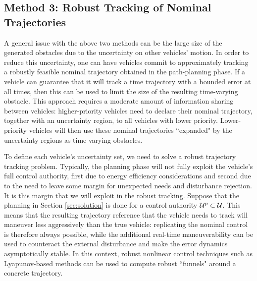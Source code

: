 \subsection{Method 3: Robust Tracking of Nominal Trajectories}
A general issue with the above two methods can be the large size of the generated obstacles due to the uncertainty on other vehicles' motion. In order to reduce this uncertainty, one can have vehicles commit to approximately tracking a robustly feasible nominal trajectory obtained in the path-planning phase. If a vehicle can guarantee that it will track a time trajectory with a bounded error at all times, then this can be used to limit the size of the resulting time-varying obstacle. This approach requires a moderate amount of information sharing between vehicles: higher-priority vehicles need to declare their nominal trajectory, together with an uncertainty region, to all vehicles with lower priority. Lower-priority vehicles will then use these nominal trajectories ``expanded" by the uncertainty regions as time-varying obstacles.

To define each vehicle's uncertainty set, we need to solve a robust trajectory tracking problem.
Typically, the planning phase will not fully exploit the vehicle's full control authority, first due to energy efficiency considerations and second due to the need to leave some margin for unexpected needs and disturbance rejection. It is this margin that we will exploit in the robust tracking. Suppose that the planning in Section \ref{sec:solution} is done for a control authority $\mathcal{U}^p\subset\mathcal{U}$. This means that the resulting trajectory reference that the vehicle needs to track will maneuver less aggressively than the true vehicle: replicating the nominal control is therefore always possible, while the additional real-time maneuverability can be used to counteract the external disturbance and make the error dynamics asymptotically stable. In this context, robust nonlinear control techniques such as Lyapunov-based methods
\cite{Majumdar2013}%
can be used to compute robust ``funnels" around a concrete trajectory.

